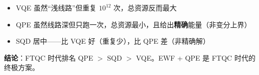 \documentclass[11pt,a4paper]{article}
\begin{document}
\begin{itemize}
  \item VQE 虽然``浅线路''但重复 $10^{12}$ 次，总资源反而最大
  \item QPE 虽然线路深但只跑一次，总资源最小，且给出\textbf{精确}能量（非变分上界）
  \item SQD 居中——比 VQE 好（重复少），比 QPE 差（非精确解）
\end{itemize}

\textbf{结论}：FTQC 时代排名 QPE $>$ SQD $>$ VQE。EWF + QPE 是 FTQC 时代的终极方案。
\end{document}
